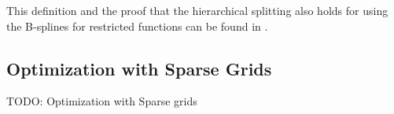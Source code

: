 This definition and the proof that the hierarchical splitting also holds for using the B-splines for restricted functions can be found in \cite{b_splines}.

\subsection{Optimization with Sparse Grids}

TODO: Optimization with Sparse grids

